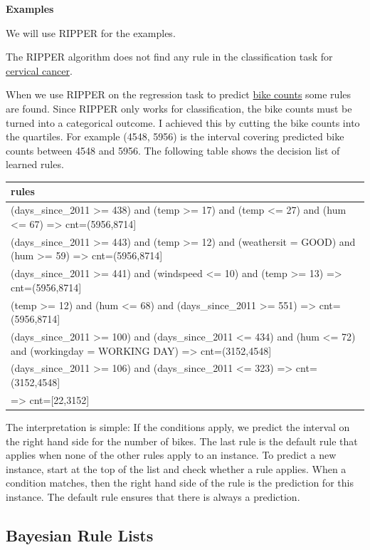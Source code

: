 \documentclass[
  12pt,
]{krantz}
\begin{document}
\textbf{Examples}

We will use RIPPER for the examples.

The RIPPER algorithm does not find any rule in the classification task for \protect\hyperlink{cervical}{cervical cancer}.

When we use RIPPER on the regression task to predict \protect\hyperlink{bike-data}{bike counts} some rules are found.
Since RIPPER only works for classification, the bike counts must be turned into a categorical outcome.
I achieved this by cutting the bike counts into the quartiles.
For example (4548, 5956) is the interval covering predicted bike counts between 4548 and 5956.
The following table shows the decision list of learned rules.

\begin{tabular}{>{\raggedright\arraybackslash}p{10cm}}
\hline
rules\\
\hline
(days\_since\_2011 >= 438) and (temp >= 17) and (temp <= 27) and (hum <= 67) => cnt=(5956,8714]\\
\hline
(days\_since\_2011 >= 443) and (temp >= 12) and (weathersit = GOOD) and (hum >= 59) => cnt=(5956,8714]\\
\hline
(days\_since\_2011 >= 441) and (windspeed <= 10) and (temp >= 13) => cnt=(5956,8714]\\
\hline
(temp >= 12) and (hum <= 68) and (days\_since\_2011 >= 551) => cnt=(5956,8714]\\
\hline
(days\_since\_2011 >= 100) and (days\_since\_2011 <= 434) and (hum <= 72) and (workingday = WORKING DAY) => cnt=(3152,4548]\\
\hline
(days\_since\_2011 >= 106) and (days\_since\_2011 <= 323) => cnt=(3152,4548]\\
\hline
=> cnt=[22,3152]\\
\hline
\end{tabular}

The interpretation is simple:
If the conditions apply, we predict the interval on the right hand side for the number of bikes.
The last rule is the default rule that applies when none of the other rules apply to an instance.
To predict a new instance, start at the top of the list and check whether a rule applies.
When a condition matches, then the right hand side of the rule is the prediction for this instance.
The default rule ensures that there is always a prediction.

\hypertarget{bayesian-rule-lists}{%
\subsection{Bayesian Rule Lists}\label{bayesian-rule-lists}}
\end{document}
